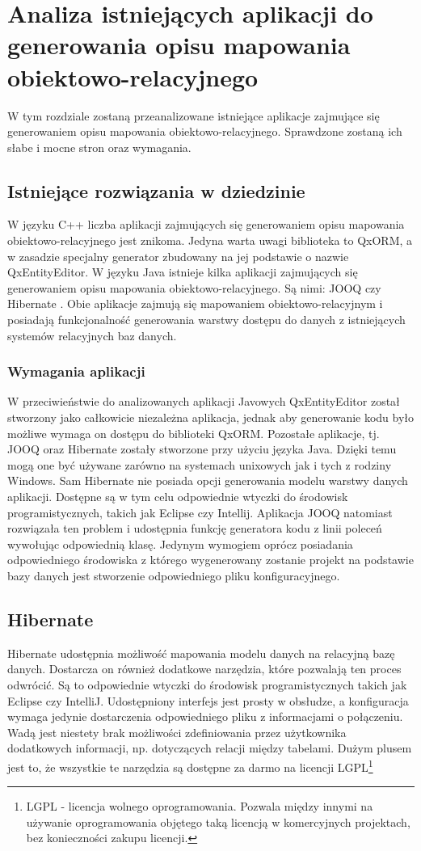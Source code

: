 \documentclass[12pt]{report}
\begin{document}
\chapter{Analiza istniejących aplikacji do generowania opisu mapowania obiektowo-relacyjnego}\label{chap:analiza}
W tym rozdziale zostaną przeanalizowane istniejące aplikacje zajmujące się generowaniem opisu mapowania obiektowo-relacyjnego. Sprawdzone zostaną ich słabe i mocne stron oraz wymagania.
\section{Istniejące rozwiązania w dziedzinie}
\indent W języku C++ liczba aplikacji zajmujących się generowaniem opisu mapowania obiektowo-relacyjnego jest znikoma. Jedyna warta uwagi biblioteka to QxORM, a w zasadzie specjalny generator zbudowany na jej podstawie o nazwie QxEntityEditor. W języku Java istnieje kilka aplikacji zajmujących się generowaniem opisu mapowania obiektowo-relacyjnego. Są nimi: JOOQ \cite{jooqweb} czy Hibernate \cite{hibernateweb}. Obie aplikacje zajmują się mapowaniem obiektowo-relacyjnym i posiadają funkcjonalność generowania warstwy dostępu do danych z istniejących systemów relacyjnych baz danych.
\subsection{Wymagania aplikacji}
W przeciwieństwie do analizowanych aplikacji Javowych QxEntityEditor został stworzony jako całkowicie niezależna aplikacja, jednak aby generowanie kodu było możliwe wymaga on dostępu do biblioteki QxORM. Pozostałe aplikacje, tj. JOOQ oraz Hibernate zostały stworzone przy użyciu języka Java. Dzięki temu mogą one być używane zarówno na systemach unixowych jak i tych z rodziny Windows. Sam Hibernate nie posiada opcji generowania modelu warstwy danych aplikacji. Dostępne są w tym celu odpowiednie wtyczki do środowisk programistycznych, takich jak Eclipse czy Intellij. Aplikacja JOOQ natomiast rozwiązała ten problem i udostępnia funkcję generatora kodu z linii poleceń wywołując odpowiednią klasę.
Jedynym wymogiem oprócz posiadania odpowiedniego środowiska z którego wygenerowany zostanie projekt na podstawie bazy danych jest stworzenie odpowiedniego pliku konfiguracyjnego.

\section{Hibernate}
Hibernate udostępnia możliwość mapowania modelu danych na relacyjną bazę danych. Dostarcza on również dodatkowe narzędzia, które pozwalają ten proces odwrócić. Są to odpowiednie wtyczki do środowisk programistycznych takich jak Eclipse czy IntelliJ. Udostępniony interfejs jest prosty w obsłudze, a konfiguracja wymaga jedynie dostarczenia odpowiedniego pliku z informacjami o połączeniu. Wadą jest niestety brak możliwości zdefiniowania przez użytkownika dodatkowych informacji, np. dotyczących relacji między tabelami. Dużym plusem jest to, że wszystkie te narzędzia są dostępne za darmo na licencji LGPL\footnote{LGPL - licencja wolnego oprogramowania. Pozwala między innymi na używanie oprogramowania objętego taką licencją w komercyjnych projektach, bez konieczności zakupu licencji.}
\end{document}
